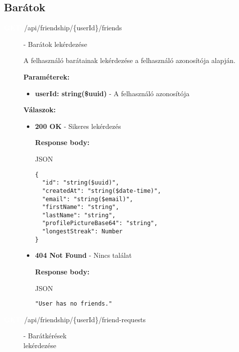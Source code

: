 \documentclass[12pt]{report}
\newcommand{\httpGet}[1]{\colorbox{getColor}{\textbf{\textcolor{white}{GET}}}~#1}
\begin{document}
\subsection{Barátok}
\begin{description}
  \item[\httpGet{/api/friendship/\{userId\}/friends}] - Barátok lekérdezése

    \vspace{0.5cm}
    A felhasználó barátainak lekérdezése a felhasználó azonosítója alapján.

    \vspace{0.5cm}
    \textbf{Paraméterek:}
    \begin{itemize}
      \item \textbf{userId: string(\$uuid)} - A felhasználó azonosítója
    \end{itemize}

    \vspace{0.5cm}
    \textbf{Válaszok:}
    \begin{itemize}
      \item \textbf{200 OK} - Sikeres lekérdezés

        \textbf{Response body:}
        \begin{codeblock}{JSON}
          \begin{verbatim}
{
  "id": "string($uuid)",
  "createdAt": "string($date-time)",
  "email": "string($email)",
  "firstName": "string",
  "lastName": "string",
  "profilePictureBase64": "string",
  "longestStreak": Number
}
          \end{verbatim}
        \end{codeblock}

      \item \textbf{404 Not Found} - Nincs találat
      
        \textbf{Response body:}
        \begin{codeblock}{JSON}
          \begin{verbatim}
"User has no friends."
          \end{verbatim}
        \end{codeblock}
    \end{itemize}

  \item[\httpGet{/api/friendship/\{userId\}/friend-requests}]- Barátkérések ~\\
  \indent lekérdezése


\end{description}
\end{document}
